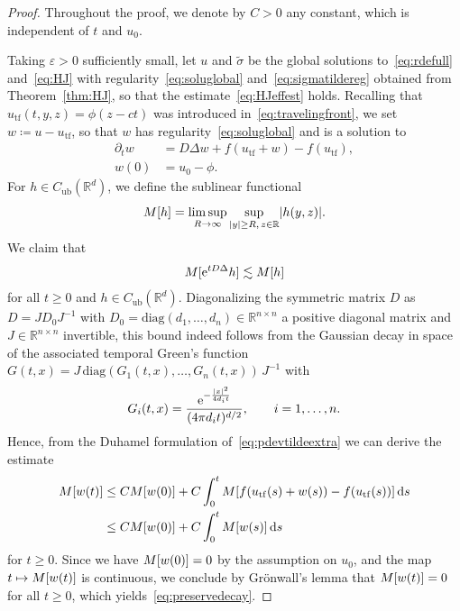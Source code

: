 \documentclass[12pt,oneside,a4paper,reqno]{amsart}
\numberwithin{equation}{section}
\theoremstyle{definition}
\theoremstyle{remark}
\newcommand{\bbR}{{\mathbb R}}
\newcommand{\rd}{{\,\rm{d}}}
\newcommand{\eps}{\varepsilon}
\newcommand{\Cub}{{C_{\mathrm{ub}}}}
\newcommand{\re}{{\rm e}}
\DeclarePairedDelimiter{\abs}{\lvert}{\rvert}
\DeclarePairedDelimiter{\sqr}{[}{]}
\begin{document}
\begin{proof} Throughout the proof, we denote by $C > 0$ any constant, which is independent of $t$ and $u_0$.

Taking $\eps > 0$ sufficiently small, let $u$ and $\tilde{\sigma}$ be the global solutions to~\eqref{eq:rdefull} and~\eqref{eq:HJ} with regularity~\eqref{eq:soluglobal} and~\eqref{eq:sigmatildereg} obtained from Theorem~\ref{thm:HJ},
so that the estimate~\eqref{eq:HJeffest} holds.
Recalling that $u_{\mathrm{tf}}(t,y,z) = \phi(z - ct)$ was introduced in~\eqref{eq:travelingfront}, we set $w \coloneq u - u_{\mathrm{tf}}$, so that $w$ has regularity~\eqref{eq:soluglobal} and is a solution to
    \begin{equation}
    \label{eq:pdevtildeextra}
    \begin{aligned}
        \partial_t w &= D \Delta w + f(u_{\mathrm{tf}} + w) - f(u_{\mathrm{tf}}), \\
        w(0) &= u_0 - \phi.
    \end{aligned}
    \end{equation}
    For $h \in \Cub(\bbR^d)$, we define the sublinear functional
\begin{equation*}
    M\sqr{h} = \limsup_{R \to \infty} \sup_{\abs{y} \geq R,\, z \in \bbR} \abs{h(y,z)}.
\end{equation*}
We claim that
\begin{align*}
    M\sqr{\re^{t D \Delta}h} \lesssim M\sqr{h}
\end{align*}
for all $t \geq 0$ and $h \in \Cub(\bbR^d)$. Diagonalizing the symmetric matrix $D$ as $D = JD_0J^{-1}$ with $D_0 = \mathrm{diag}(d_1,\ldots,d_n) \in \bbR^{n \times n}$ a positive diagonal matrix and $J \in \bbR^{n \times n}$ invertible, this bound indeed follows from the Gaussian decay in space of the associated temporal Green's function $G(t,x) = J\,\mathrm{diag}(G_1(t,x),\ldots,G_n(t,x))\,J^{-1}$ with 
\begin{align*}
G_i(t,x) = \frac{\re^{-\frac{\abs{x}^2}{4d_i t}}}{(4\pi d_i t)^{d/2}}, \qquad i = 1,\ldots,n.
\end{align*}
    Hence, from the Duhamel formulation of~\eqref{eq:pdevtildeextra} we can derive the estimate
    \begin{align*}
        M\sqr{w(t)} &\leq C M\sqr{w(0)} + C\int_0^t M\sqr{f(u_{\mathrm{tf}}(s) + w(s)) - f(u_{\mathrm{tf}}(s))} \rd s \\
        &\leq CM\sqr{w(0)} + C\int_0^t M\sqr{w(s)} \rd s
    \end{align*}
    for $t \geq 0$. Since we have $M\sqr{w(0)} = 0$ by the assumption on $u_0$, and the map $t \mapsto M\sqr{w(t)}$ is continuous, we conclude by Gr\"onwall's lemma that $M\sqr{w(t)} = 0$ for all $t \geq 0$, which yields~\eqref{eq:preservedecay}.


\end{proof}
\end{document}
